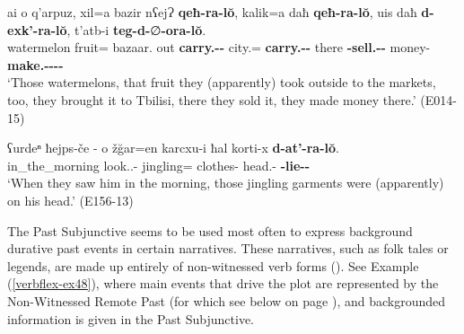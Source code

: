 \begin{exe}
	\ex\label{verbflex-ex22}
	\begin{xlist}
		
		
			\ex\label{verbflex-ex22a}
			\gll ai o q'arpuz, xil=a bazir nʕejɁ \textbf{qeħ-ra-l\u{o}}, kalik=a daħ \textbf{qeħ-ra-l\u{o}}, uis daħ \textbf{d-exk'-ra-l\u{o}}, t'atb-i \textbf{teg-d-}∅\textbf{-ora-l\u{o}}. \\
			{\Deict} {\Dist} watermelon fruit={\Add} bazaar.{\Ill} out \textbf{carry.{\Ipfv}-{\Imprf}-{\Sbjv}} city.{\Ill}={\Add} {\Pv} \textbf{carry.{\Ipfv}-{\Imprf}-{\Sbjv}} there {\Pv} \textbf{{\D}-sell.{\Ipfv}-{\Imprf}-{\Sbjv}} money-{\Pl} \textbf{make.{\Imprf}-{\D}-{\Tr}-{\Imprf}-{\Sbjv}} \\
			\trans `Those watermelons, that fruit they (apparently) took outside to the markets, too, they brought it to Tbilisi, there they sold it, they made money there.'
			\hfill (E014-15)
		
		
		
			\ex\label{verbflex-ex22b}
			\gll ʕurdeⁿ ħejps-če - o ž\u{g}ar=en karcxu-i ħal korti-x \textbf{d-at'-ra-l\u{o}}. \\
			in\_the\_morning look.{\Pl}.{\Pfv}-{\Ante} {} {\Dist} jingling={\Quot} clothes-{\Pl} {\Pv} head.{\Obl}-{\Cont} \textbf{{\D}-lie-{\Imprf}-{\Sbjv}} \\
			\trans `When they saw him in the morning, those jingling garments were (apparently) on his head.'
			\hfill (E156-13)
		
		
	\end{xlist}
\end{exe}

The Past Subjunctive seems to be used most often to express background durative past events in certain narratives. These narratives, such as folk tales or legends, are made up entirely of  non-witnessed verb forms  (\cite{wsverhees2024nakhevid}). See Example (\ref{verbflex-ex48}), where main events that drive the plot are represented by the Non-Witnessed Remote Past (for which see below on page \pageref{nw.rem}), and backgrounded information is given in the Past Subjunctive.


